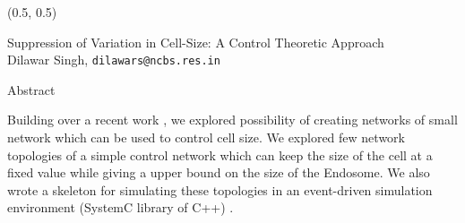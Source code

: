 \documentclass{beamer}
\begin{document}
\begin{textblock}{15}(0.5, 0.5)
    \begin{block}{}
        \centering
        \Large Suppression of Variation in Cell-Size: A Control Theoretic Approach \\
        \large Dilawar Singh, \texttt{dilawars@ncbs.res.in}
    \end{block}
    \begin{block}{Abstract}

        Building over a recent work \cite{paulsson}, we explored possibility of
        creating networks of small network which can be used to control cell
        size. We explored few network topologies of a simple control network
        which can keep the size of the cell at a fixed value while giving a
        upper bound on the size of the Endosome. We also wrote a skeleton for
        simulating these topologies in an event-driven simulation environment
        (SystemC library of C++) \cite{github}.

\end{block}
\end{textblock}
\end{document}
